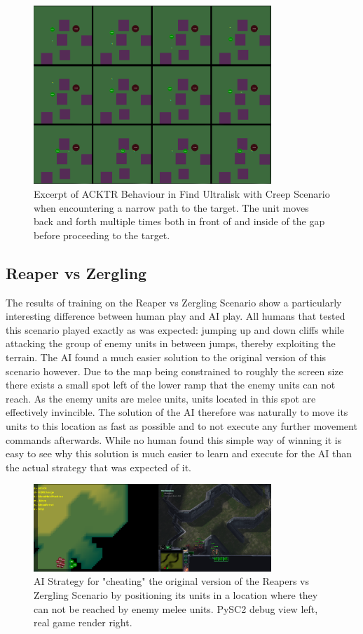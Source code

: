 \begin{figure}[htb]
  \centering
      \includegraphics[width=0.8\textwidth]{Figures/fu_sequence.png}
  \caption{Excerpt of ACKTR Behaviour in Find Ultralisk with Creep Scenario when encountering a narrow path to the target. The unit moves back and forth multiple times both in front of and inside of the gap before proceeding to the target.}
  \label{fig:fu_shuffle}
\end{figure}


\subsection{Reaper vs Zergling}
The results of training on the Reaper vs Zergling Scenario show a particularly interesting difference between human play and AI play. All humans that tested this scenario played exactly as was expected: jumping up and down cliffs while attacking the group of enemy units in between jumps, thereby exploiting the terrain. The AI found a much easier solution to the original version of this scenario however. Due to the map being constrained to roughly the screen size there exists a small spot left of the lower ramp that the enemy units can not reach. As the enemy units are melee units, units located in this spot are effectively invincible. The solution of the AI therefore was naturally to move its units to this location as fast as possible and to not execute any further movement commands afterwards. While no human found this simple way of winning it is easy to see why this solution is much easier to learn and execute for the AI than the actual strategy that was expected of it.

\begin{figure}[htb]
  \centering
      \includegraphics[width=0.8\textwidth]{Figures/rz_badramp.png}
  \caption{AI Strategy for "cheating" the original version of the Reapers vs Zergling Scenario by positioning its units in a location where they can not be reached by enemy melee units. PySC2 debug view left, real game render right.}
  \label{fig:rzstrat}
\end{figure}

